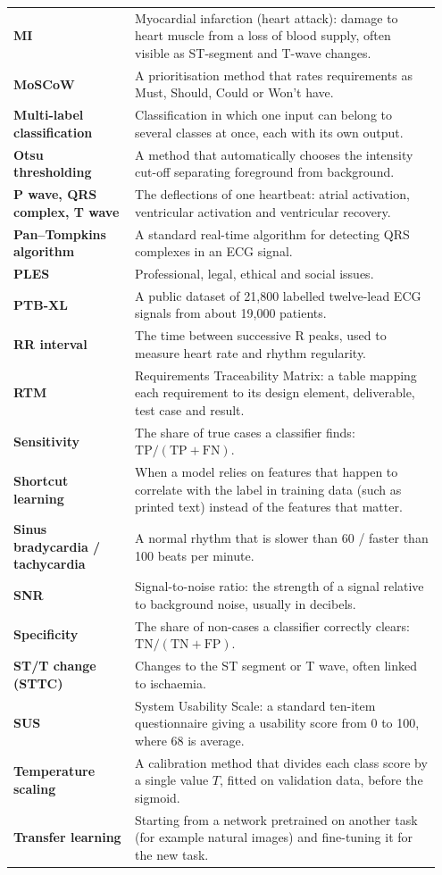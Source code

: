 \begin{longtable}{@{}>{\raggedright\arraybackslash}p{0.27\linewidth} p{0.68\linewidth}@{}}
  \textbf{MI} & Myocardial infarction (heart attack): damage to heart muscle from a loss of blood supply, often visible as ST-segment and T-wave changes. \\
  \textbf{MoSCoW} & A prioritisation method that rates requirements as Must, Should, Could or Won't have. \\
  \textbf{Multi-label classification} & Classification in which one input can belong to several classes at once, each with its own output. \\
  \textbf{Otsu thresholding} & A method that automatically chooses the intensity cut-off separating foreground from background. \\
  \textbf{P wave, QRS complex, T wave }& The deflections of one heartbeat: atrial activation, ventricular activation and ventricular recovery. \\
  \textbf{Pan--Tompkins algorithm} & A standard real-time algorithm for detecting QRS complexes in an ECG signal. \\
  \textbf{PLES} & Professional, legal, ethical and social issues. \\
  \textbf{PTB-XL} & A public dataset of 21,800 labelled twelve-lead ECG signals from about 19,000 patients. \\
  \textbf{RR interval} & The time between successive R peaks, used to measure heart rate and rhythm regularity. \\
  \textbf{RTM} & Requirements Traceability Matrix: a table mapping each requirement to its design element, deliverable, test case and result. \\
  \textbf{Sensitivity} & The share of true cases a classifier finds: $\mathrm{TP}/(\mathrm{TP}+\mathrm{FN})$. \\
  \textbf{Shortcut learning} & When a model relies on features that happen to correlate with the label in training data (such as printed text) instead of the features that matter. \\
  \textbf{Sinus bradycardia / tachycardia} & A normal rhythm that is slower than 60 / faster than 100 beats per minute. \\
  \textbf{SNR} & Signal-to-noise ratio: the strength of a signal relative to background noise, usually in decibels. \\
  \textbf{Specificity} & The share of non-cases a classifier correctly clears: $\mathrm{TN}/(\mathrm{TN}+\mathrm{FP})$. \\
  \textbf{ST/T change (STTC)} & Changes to the ST segment or T wave, often linked to ischaemia. \\
  \textbf{SUS} & System Usability Scale: a standard ten-item questionnaire giving a usability score from 0 to 100, where 68 is average. \\
  \textbf{Temperature scaling} & A calibration method that divides each class score by a single value $T$, fitted on validation data, before the sigmoid. \\
  \textbf{Transfer learning} & Starting from a network pretrained on another task (for example natural images) and fine-tuning it for the new task. \\
\end{longtable}
\endgroup